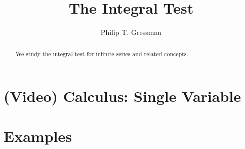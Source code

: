 \documentclass{ximera}
\title{The Integral Test}
\author{Philip T. Gressman}
\begin{document}
\begin{abstract}
  We study the integral test for infinite series and related concepts.
\end{abstract}
\maketitle

\section*{(Video) Calculus: Single Variable}

\section*{Examples}

\begin{example}

\end{example}

\begin{example}

\end{example}
\end{document}
